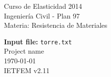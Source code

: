 \documentclass[a4paper,11pt]{article}
\begin{document}
      

\pagestyle{fancy}                            
\cfoot{}                                     


\begin{minipage}[t]{1\textwidth}      
\vspace{0.5mm}      
\noindent      
Curso de Elasticidad 2014 \\     
Ingeniería Civil - Plan 97 \\      
Materia: Resistencia de Materiales      

\begin{center}      
\textbf{\Large{ Input file:}}\Large{ \verb+torre.txt+}  \\      
\large{Project name \\}       
\today\\      
IETFEM v2.11      
\vspace{-2.9cm}      
\end{center}      
\end{minipage}      
\hspace{-2cm}      
\end{document}
